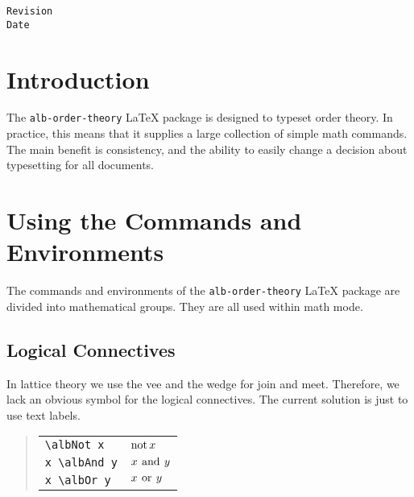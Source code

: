 \documentclass[11pt,a4paper,oneside]{alb-latex}
\begin{document}
\begin{albTitlePage}

  \verb$Revision$\\
  \verb$Date$

\end{albTitlePage}




\section{Introduction}
\label{sec:alb-order-theory-documentation:intr}

The \texttt{alb-order-theory} \LaTeX{} package is designed to typeset
order theory.  In practice, this means that it supplies a large
collection of simple math commands.  The main benefit is consistency,
and the ability to easily change a decision about typesetting for all
documents.




\section{Using the Commands and Environments}
\label{sec:alb-order-theory-documentation:using-comm-envir}

The commands and environments of the \texttt{alb-order-theory} \LaTeX{}
package are divided into mathematical groups.  They are all used within
math mode.



\subsection{Logical Connectives}
\label{sec:alb-order-theory-documentation:logical-conn}

In lattice theory we use the vee and the wedge for join and meet.
Therefore, we lack an obvious symbol for the logical connectives.  The
current solution is just to use text labels.

\begin{quote}
  \begin{tabular}{p{}@{\qquad}p{}}
    \verb$\albNot x$ & $\mathop{\mathrm{not}} x$ \\
    \verb$x \albAnd y$ & $x \mathbin{\,\mathrm{and}\,} y$ \\
    \verb$x \albOr y$ & $x \mathbin{\,\mathrm{or}\,} y$
  \end{tabular}
\end{quote}
\end{document}

